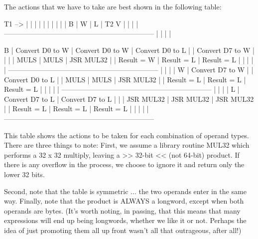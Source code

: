 \documentclass[float=false, crop=false]{standalone}
\begin{document}
The actions that we have to take are best shown in  the following
table:

  T1 -->  |                 |                 |                 |
          |                 |                 |                 |
      |   |        B        |        W        |       L         |
  T2  V   |                 |                 |                 |
-----------------------------------------------------------------
          |                 |                 |                 |







     B    | Convert D0 to W | Convert D0 to W | Convert D0 to L |
          | Convert D7 to W |                 |                 |
          | MULS            | MULS            | JSR MUL32       |
          | Result = W      | Result = L      | Result = L      |
          |                 |                 |                 |
-----------------------------------------------------------------
          |                 |                 |                 |
     W    | Convert D7 to W |                 | Convert D0 to L |
          | MULS            | MULS            | JSR MUL32       |
          | Result = L      | Result = L      | Result = L      |
          |                 |                 |                 |
-----------------------------------------------------------------
          |                 |                 |                 |
     L    | Convert D7 to L | Convert D7 to L |                 |
          | JSR MUL32       | JSR MUL32       | JSR MUL32       |
          | Result = L      | Result = L      | Result = L      |
          |                 |                 |                 |
-----------------------------------------------------------------

This table shows the actions to be taken for each combination of operand types.
There are three things to note: First, we assume a library routine MUL32 which
performs a 32 x 32 multiply, leaving a >> 32-bit << (not 64-bit) product. If
there is any overflow in the process, we choose to ignore it and return only the
lower 32 bits.

Second, note that the table is symmetric ... the two operands enter in the same
way. Finally, note that the product is ALWAYS a longword, except when both
operands are bytes. (It's worth noting, in passing, that this means that many
expressions will end up being longwords, whether we like it or not. Perhaps the
idea of just promoting them all up front wasn't all that outrageous, after all!)
\end{document}

